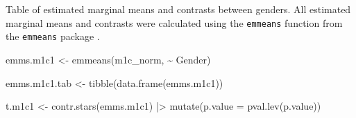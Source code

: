 \documentclass[
  bookmarksnumbered]{article}
\newenvironment{Shaded}{\begin{snugshade}}{\end{snugshade}}
\newcommand{\AttributeTok}[1]{\textcolor[rgb]{0.80,0.80,0.80}{#1}}
\newcommand{\FunctionTok}[1]{\textcolor[rgb]{0.94,0.94,0.56}{#1}}
\newcommand{\NormalTok}[1]{\textcolor[rgb]{0.80,0.80,0.80}{#1}}
\newcommand{\OtherTok}[1]{\textcolor[rgb]{0.94,0.94,0.56}{#1}}
\newcommand{\SpecialCharTok}[1]{\textcolor[rgb]{0.86,0.64,0.64}{#1}}
\begin{document}
Table of estimated marginal means and contrasts between genders. All estimated marginal means and contrasts were calculated using the \texttt{emmeans} function from the \texttt{emmeans} package \autocite{emmeanscit}.

\begin{Shaded}
\begin{Highlighting}[]
\NormalTok{emms.m1c1 }\OtherTok{\textless{}{-}} \FunctionTok{emmeans}\NormalTok{(m1c\_norm, }\SpecialCharTok{\textasciitilde{}}\NormalTok{ Gender)}

\NormalTok{emms.m1c1.tab }\OtherTok{\textless{}{-}} \FunctionTok{tibble}\NormalTok{(}\FunctionTok{data.frame}\NormalTok{(emms.m1c1))}

\NormalTok{t.m1c1 }\OtherTok{\textless{}{-}} \FunctionTok{contr.stars}\NormalTok{(emms.m1c1) }\SpecialCharTok{|\textgreater{}} 
  \FunctionTok{mutate}\NormalTok{(}\AttributeTok{p.value =} \FunctionTok{pval.lev}\NormalTok{(p.value))}


\end{Highlighting}
\end{Shaded}
\end{document}
